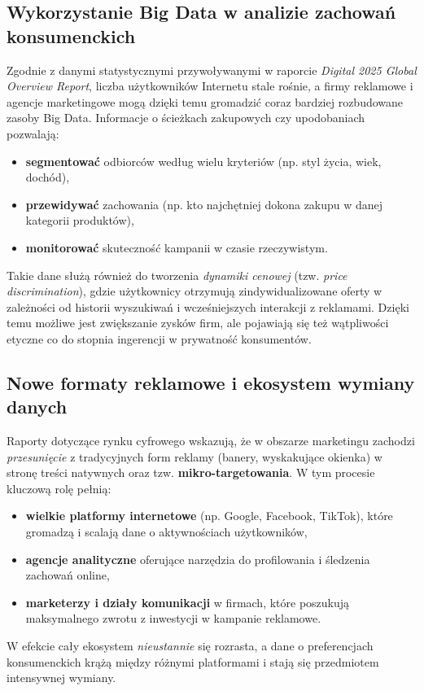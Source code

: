 \subsection{Wykorzystanie Big Data w analizie zachowań konsumenckich}
Zgodnie z danymi statystycznymi przywoływanymi w raporcie \emph{Digital 2025 Global Overview Report}\cite{DIGITAL_GLOBAL}, liczba użytkowników Internetu stale rośnie, a firmy reklamowe i agencje marketingowe mogą dzięki temu gromadzić coraz bardziej rozbudowane zasoby Big Data. Informacje o ścieżkach zakupowych czy upodobaniach pozwalają:
\begin{itemize}
    \item \textbf{segmentować} odbiorców według wielu kryteriów (np. styl życia, wiek, dochód),
    \item \textbf{przewidywać} zachowania (np. kto najchętniej dokona zakupu w danej kategorii produktów),
    \item \textbf{monitorować} skuteczność kampanii w czasie rzeczywistym.
\end{itemize}

Takie dane służą również do tworzenia \emph{dynamiki cenowej} (tzw. \emph{price discrimination}), gdzie użytkownicy otrzymują zindywidualizowane oferty w zależności od historii wyszukiwań i wcześniejszych interakcji z reklamami. Dzięki temu możliwe jest zwiększanie zysków firm, ale pojawiają się też wątpliwości etyczne co do stopnia ingerencji w prywatność konsumentów.

\subsection{Nowe formaty reklamowe i ekosystem wymiany danych}
Raporty dotyczące rynku cyfrowego wskazują, że w obszarze marketingu zachodzi \emph{przesunięcie} z tradycyjnych form reklamy (banery, wyskakujące okienka) w stronę treści natywnych oraz tzw. \textbf{mikro-targetowania}. W tym procesie kluczową rolę pełnią:
\begin{itemize}
    \item \textbf{wielkie platformy internetowe} (np. Google, Facebook, TikTok), które gromadzą i scalają dane o aktywnościach użytkowników,
    \item \textbf{agencje analityczne} oferujące narzędzia do profilowania i śledzenia zachowań online,
    \item \textbf{marketerzy i działy komunikacji} w firmach, które poszukują maksymalnego zwrotu z inwestycji w kampanie reklamowe.
\end{itemize}
W efekcie cały ekosystem \emph{nieustannie} się rozrasta, a dane o preferencjach konsumenckich krążą między różnymi platformami i stają się przedmiotem intensywnej wymiany.

